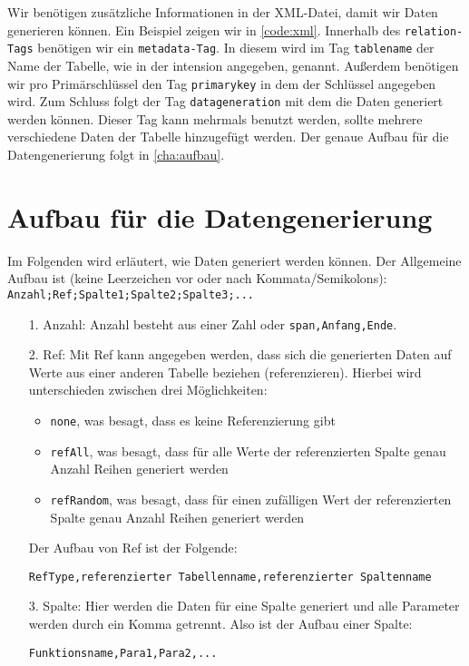 \documentclass[11pt]{report}
\begin{document}
Wir benötigen zusätzliche Informationen in der XML-Datei, damit wir Daten generieren können. Ein Beispiel zeigen wir in \autoref{code:xml}. Innerhalb des \texttt{relation-Tags} benötigen wir ein \texttt{metadata-Tag}. In diesem wird im Tag \texttt{tablename} der Name der Tabelle, wie in der intension angegeben, genannt. Außerdem benötigen wir pro Primärschlüssel den Tag \texttt{primarykey} in dem der Schlüssel angegeben wird. Zum Schluss folgt der Tag \texttt{datageneration} mit dem die Daten generiert werden können. Dieser Tag kann mehrmals benutzt werden, sollte mehrere verschiedene Daten der Tabelle hinzugefügt werden. Der genaue Aufbau für die Datengenerierung folgt in \autoref{cha:aufbau}.

\begin{figure}[h]
	\centering
	\begin{minipage}{0.9\textwidth}
		
	\end{minipage}
\end{figure}


\section{Aufbau für die Datengenerierung}
\label{cha:aufbau}

Im Folgenden wird erläutert, wie Daten generiert werden können. Der Allgemeine Aufbau ist (keine Leerzeichen vor oder nach Kommata/Semikolons):\\

\texttt{Anzahl;Ref;Spalte1;Spalte2;Spalte3;...}

\begin{itemize}
\item[1.] Anzahl: Anzahl besteht aus einer Zahl oder \texttt{span,Anfang,Ende}.
\item[2.] Ref: Mit Ref kann angegeben werden, dass sich die generierten Daten auf Werte aus einer anderen Tabelle beziehen (referenzieren). Hierbei wird unterschieden zwischen drei Möglichkeiten:
\begin{itemize}
\item \texttt{none}, was besagt, dass es keine Referenzierung gibt
\item \texttt{refAll}, was besagt, dass für alle Werte der referenzierten Spalte genau Anzahl Reihen generiert werden
\item \texttt{refRandom}, was besagt, dass für einen zufälligen Wert der referenzierten Spalte genau Anzahl Reihen generiert werden
\end{itemize}
Der Aufbau von Ref ist der Folgende:

\texttt{RefType,referenzierter Tabellenname,referenzierter Spaltenname}

\item[3.] Spalte: Hier werden die Daten für eine Spalte generiert und alle Parameter werden durch ein Komma getrennt. Also ist der Aufbau einer Spalte:

\texttt{Funktionsname,Para1,Para2,...}

\end{itemize}
\end{document}
